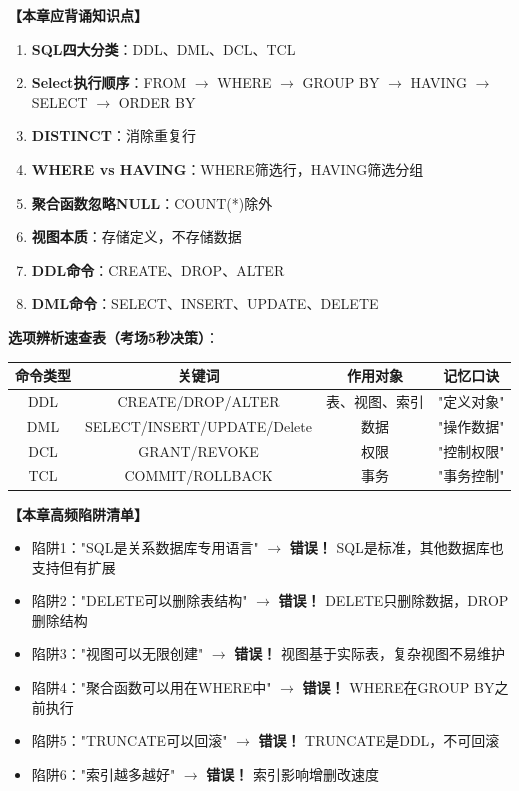 \documentclass[12pt, a4paper]{article}
\newenvironment{bluebox}[1]{%
  \begin{trivlist}
  \item[\hskip\labelsep \textbf{#1}]
  \setlength{\parskip}{0.5ex}
  \setlength{\itemsep}{0.5ex}
}{%
  \end{trivlist}
}
\begin{document}
\begin{bluebox}{命题人思维版}
	\textbf{【本章应背诵知识点】}

	\begin{enumerate}[leftmargin=*, label=\textbf{\arabic*.}]
		\item \textbf{SQL四大分类}：DDL、DML、DCL、TCL
		\item \textbf{Select执行顺序}：FROM $\rightarrow$ WHERE $\rightarrow$ GROUP BY $\rightarrow$ HAVING $\rightarrow$ SELECT $\rightarrow$ ORDER BY
		\item \textbf{DISTINCT}：消除重复行
		\item \textbf{WHERE vs HAVING}：WHERE筛选行，HAVING筛选分组
		\item \textbf{聚合函数忽略NULL}：COUNT(*)除外
		\item \textbf{视图本质}：存储定义，不存储数据
		\item \textbf{DDL命令}：CREATE、DROP、ALTER
		\item \textbf{DML命令}：SELECT、INSERT、UPDATE、DELETE
	\end{enumerate}

	\textbf{选项辨析速查表（考场5秒决策）}：

	\begin{tabular}{|c|c|c|c|}
		\hline
		\textbf{命令类型} & \textbf{关键词}                & \textbf{作用对象} & \textbf{记忆口诀} \\
		\hline
		DDL           & CREATE/DROP/ALTER           & 表、视图、索引       & "定义对象"        \\
		\hline
		DML           & SELECT/INSERT/UPDATE/Delete & 数据            & "操作数据"        \\
		\hline
		DCL           & GRANT/REVOKE                & 权限            & "控制权限"        \\
		\hline
		TCL           & COMMIT/ROLLBACK             & 事务            & "事务控制"        \\
		\hline
	\end{tabular}
\end{bluebox}

\begin{bluebox}{高频陷阱清单}
	\textbf{【本章高频陷阱清单】}

	\begin{itemize}
		\item 陷阱1："SQL是关系数据库专用语言" $\rightarrow$ \textbf{错误！} SQL是标准，其他数据库也支持但有扩展
		\item 陷阱2："DELETE可以删除表结构" $\rightarrow$ \textbf{错误！} DELETE只删除数据，DROP删除结构
		\item 陷阱3："视图可以无限创建" $\rightarrow$ \textbf{错误！} 视图基于实际表，复杂视图不易维护
		\item 陷阱4："聚合函数可以用在WHERE中" $\rightarrow$ \textbf{错误！} WHERE在GROUP BY之前执行
		\item 陷阱5："TRUNCATE可以回滚" $\rightarrow$ \textbf{错误！} TRUNCATE是DDL，不可回滚
		\item 陷阱6："索引越多越好" $\rightarrow$ \textbf{错误！} 索引影响增删改速度
	\end{itemize}
\end{bluebox}
\end{document}
